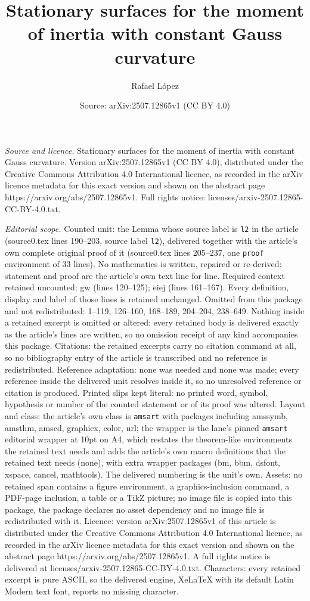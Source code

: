 \documentclass[10pt,a4paper]{amsart}
\title[Stationary surfaces for the moment of inertia with constant ]{Stationary surfaces for the moment of inertia with constant Gauss curvature}
\author{Rafael L\'opez}
\date{Source: arXiv:2507.12865v1 (CC BY 4.0)}
\begin{document}
\maketitle

\noindent\emph{Source and licence.} Stationary surfaces for the moment of inertia with constant Gauss curvature. Version arXiv:2507.12865v1 (CC BY 4.0), distributed under the Creative Commons Attribution 4.0 International licence, as recorded in the arXiv licence metadata for this exact version and shown on the abstract page https://arxiv.org/abs/2507.12865v1. Full rights notice: licenses/arxiv-2507.12865-CC-BY-4.0.txt.\par\smallskip

\noindent\textit{Editorial scope.} Counted unit: the Lemma whose source label is \texttt{l2} in the article (source0.tex lines 190--203, source label \texttt{l2}), delivered together with the article's own complete original proof of it (source0.tex lines 205--237, one \texttt{proof} environment of 33 lines). No mathematics is written, repaired or re-derived: statement and proof are the article's own text line for line. Required context retained uncounted: gw (lines 120--125); eiej (lines 161--167). Every definition, display and label of those lines is retained unchanged. Omitted from this package and not redistributed: 1--119, 126--160, 168--189, 204--204, 238--649. Nothing inside a retained excerpt is omitted or altered: every retained body is delivered exactly as the article's lines are written, so no omission receipt of any kind accompanies this package. Citations: the retained excerpts carry no citation command at all, so no bibliography entry of the article is transcribed and no reference is redistributed. Reference adaptation: none was needed and none was made; every reference inside the delivered unit resolves inside it, so no unresolved reference or citation is produced. Printed slips kept literal: no printed word, symbol, hypothesis or number of the counted statement or of its proof was altered. Layout and class: the article's own class is \texttt{amsart} with packages including amssymb, amsthm, amscd, graphicx, color, url; the wrapper is the lane's pinned \texttt{amsart} editorial wrapper at 10pt on A4, which restates the theorem-like environments the retained text needs and adds the article's own macro definitions that the retained text needs (none), with extra wrapper packages (bm, bbm, dsfont, xspace, cancel, mathtools). The delivered numbering is the unit's own. Assets: no retained span contains a figure environment, a graphics-inclusion command, a PDF-page inclusion, a table or a TikZ picture; no image file is copied into this package, the package declares no asset dependency and no image file is redistributed with it. Licence: version arXiv:2507.12865v1 of this article is distributed under the Creative Commons Attribution 4.0 International licence, as recorded in the arXiv licence metadata for this exact version and shown on the abstract page https://arxiv.org/abs/2507.12865v1. A full rights notice is delivered at licenses/arxiv-2507.12865-CC-BY-4.0.txt. Characters: every retained excerpt is pure ASCII, so the delivered engine, XeLaTeX with its default Latin Modern text font, reports no missing character.
\end{document}
